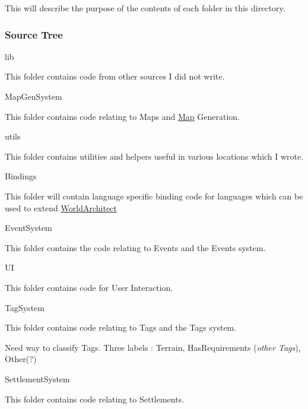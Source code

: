 This will describe the purpose of the contents of each folder in this directory.

\subsubsection*{Source Tree}


\begin{DoxyItemize}
\item lib
\begin{DoxyItemize}
\item This folder contains code from other sources I did not write.
\end{DoxyItemize}
\item Map\+Gen\+System
\begin{DoxyItemize}
\item This folder contains code relating to Maps and \mbox{\hyperlink{class_map}{Map}} Generation.
\end{DoxyItemize}
\item utils
\begin{DoxyItemize}
\item This folder contains utilities and helpers useful in various locations which I wrote.
\end{DoxyItemize}
\item Bindings
\begin{DoxyItemize}
\item This folder will contain language specific binding code for languages which can be used to extend \mbox{\hyperlink{namespace_world_architect}{World\+Architect}}
\end{DoxyItemize}
\item Event\+System
\begin{DoxyItemize}
\item This folder contains the code relating to Events and the Events system.
\end{DoxyItemize}
\item UI
\begin{DoxyItemize}
\item This folder contains code for User Interaction.
\end{DoxyItemize}
\item Tag\+System
\begin{DoxyItemize}
\item This folder contains code relating to Tags and the Tags system.
\begin{DoxyItemize}
\item Need way to classify Tags. Three labels \+: Terrain, Has\+Requirements ({\itshape other Tags}), Other(?)
\end{DoxyItemize}
\end{DoxyItemize}
\item Settlement\+System
\begin{DoxyItemize}
\item This folder contains code relating to Settlements.
\end{DoxyItemize}
\end{DoxyItemize}

